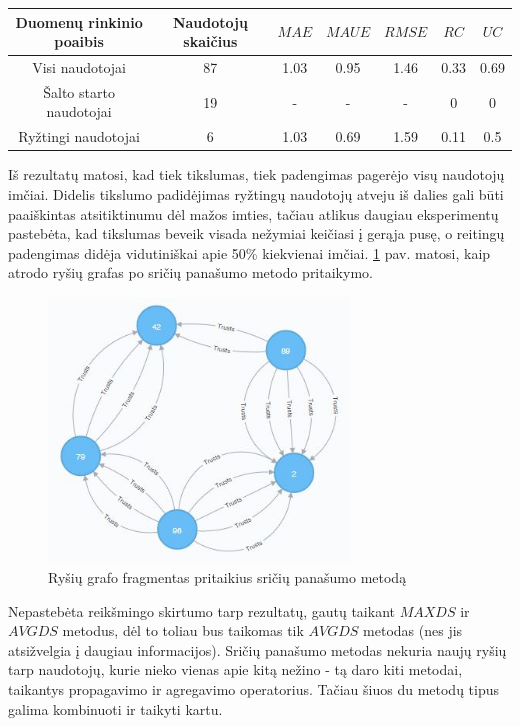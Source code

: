 \documentclass{VUMIFInfMagistrinis}
\begin{document}
\begin{center}
	\begin{tabular}{||c c c c c c c ||} 
		Duomenų rinkinio poaibis & Naudotojų skaičius & $MAE$ & $MAUE$ & $RMSE$ & $RC$ & $UC$ \\
		\hline
		Visi naudotojai & 87 & 1.03 & 0.95 & 1.46 & 0.33 & 0.69 \\
		\hline
		Šalto starto naudotojai & 19 & - & - & - & 0 & 0 \\
		\hline
		Ryžtingi naudotojai & 6 & 1.03 & 0.69 & 1.59 & 0.11 & 0.5 \\
	\end{tabular}
\end{center}
\indent
Iš rezultatų matosi, kad tiek tikslumas, tiek padengimas pagerėjo visų naudotojų imčiai. Didelis tikslumo padidėjimas ryžtingų naudotojų atveju iš dalies gali būti paaiškintas atsitiktinumu dėl mažos imties, tačiau atlikus daugiau eksperimentų pastebėta, kad tikslumas beveik visada nežymiai keičiasi į gerąja pusę, o reitingų padengimas didėja vidutiniškai apie 50\% kiekvienai imčiai.  \ref{BASEDS} pav. matosi, kaip atrodo ryšių grafas po sričių panašumo metodo pritaikymo.
\begin{figure}[ht!]
	\centering
	\includegraphics[width=80mm]{BASEDS.jpg}
	\caption{Ryšių grafo fragmentas pritaikius sričių panašumo metodą} \label{BASEDS}
\end{figure}
\newline
\indent
Nepastebėta reikšmingo skirtumo tarp rezultatų, gautų taikant $MAXDS$ ir $AVGDS$ metodus, dėl to toliau  bus taikomas tik $AVGDS$ metodas (nes jis atsižvelgia į daugiau informacijos).
\indent  Sričių panašumo metodas nekuria naujų ryšių tarp naudotojų, kurie nieko vienas apie kitą nežino - tą daro kiti metodai, taikantys propagavimo ir agregavimo operatorius. Tačiau šiuos du metodų tipus galima kombinuoti ir taikyti kartu. 
\end{document}
